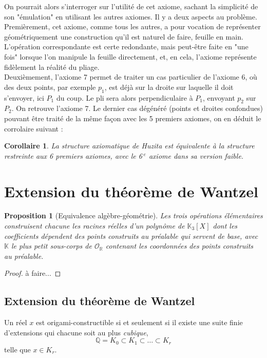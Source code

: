 \documentclass[a4paper,12pt,french]{report}
\newtheorem{proposition}{Proposition}[section]
\newtheorem{corollaire}{Corollaire}[section]
\begin{document}
		On pourrait alors s'interroger sur l'utilité de cet axiome, sachant la simplicité de son "émulation" en utilisant les autres axiomes. Il y a deux aspects au problème. Premièrement, cet axiome, comme tous les autres, a pour vocation de représenter géométriquement une construction qu'il est naturel de faire, feuille en main. L'opération correspondante est certe redondante, mais peut-être faite en "une fois" lorsque l'on manipule la feuille directement, et, en cela, l'axiome représente fidèlement la réalité du pliage.\\
		Deuxièmement, l'axiome 7 permet de traiter un cas particulier de l'axiome 6, où des deux points, par exemple $p_{1}$, est déjà sur la droite sur laquelle il doit s'envoyer, ici $P_{1}$ du coup. Le pli sera alors perpendiculaire à $P_{1}$, envoyant $p_{2}$ sur $P_{2}$. On retrouve l'axiome 7. Le dernier cas dégénéré (points et droites confondues) pouvant être traité de la même façon avec les 5 premiers axiomes, on en déduit le corrolaire suivant :
		
		\begin{corollaire}
			La structure axiomatique de Huzita est équivalente à la structure restreinte aux 6 premiers axiomes, avec le 6$^{\;e}$ axiome dans sa version faible.
		\end{corollaire}
		
	\section{Extension du théorème de Wantzel}
	
	\begin{proposition}[Equivalence algèbre-géométrie]
				Les trois opérations élémentaires construisent chacune les racines réelles d'un polynôme de \(\mathbb{K}_3[X]\) dont les coefficients dépendent des points construits au préalable qui servent de base, avec $\mathbb{K}$ le plus petit sous-corps de $\mathcal{O}_\mathbb{R}$ contenant les coordonnées des points construits au préalable.
	\end{proposition}
	
	\begin{proof}
		à faire...
	\end{proof}
	
	
	\subsection{Extension du théorème de Wantzel}
		\begin{theorem}
			Un réel \( x \) est origami-constructible si et seulement si il existe une suite finie d'extensions qui chacune soit au plus \emph{cubique},
					\[
					\mathbb{Q} = K_0 \subset K_1 \subset \dots \subset K_r
					\]
			telle que \( x \in K_r \).
		\end{theorem} 
		
\end{document}
